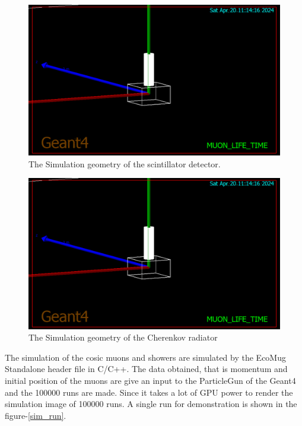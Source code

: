 \documentclass{article}
\begin{document}
\begin{multicols}{2}
\begin{figure}[H]
    \centering
    \includegraphics[width = \columnwidth]{Images/scint_sim_1.png}
    \caption{The Simulation geometry of the scintillator detector.}
    \label{scintgeo}
\end{figure}


\begin{figure}[H]
    \centering
    \includegraphics[width = \columnwidth]{Images/scint_sim_1.png}
    \caption{The Simulation geometry of the Cherenkov radiator}
    \label{chergeo}
\end{figure}

The simulation of the cosic muons and showers are simulated by the EcoMug Standalone header file in C/C++. The data obtained, that is momentum and initial position of the muons are give an input to the ParticleGun of the Geant4 and the 100000 runs are made. Since it takes a lot of GPU power to render the simulation image of 100000 runs. A single run for demonstration is shown in the figure-\ref{sim_run}.


\end{multicols}
\end{document}
